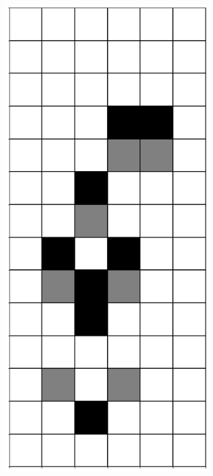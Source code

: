 \documentclass[12pt]{article}
\numberwithin{figure}{section} %
\begin{document}
\begin{figure}[H]
\begin{subfigure}{0.3\textwidth}
     		\includegraphics[angle=270,width=\linewidth]{Section4/7.0}

\end{subfigure}
\end{figure}
\end{document}
